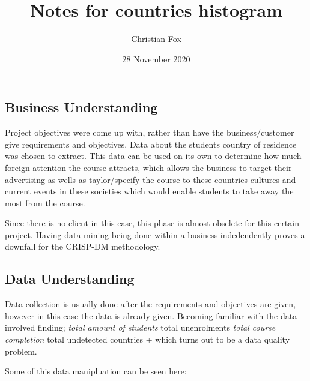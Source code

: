 \documentclass[]{article}
\title{Notes for countries histogram}
\author{Christian Fox}
\date{28 November 2020}
\begin{document}
\maketitle

\subsection{Business Understanding}\label{business-understanding}

Project objectives were come up with, rather than have the
business/customer give requirements and objectives. Data about the
students country of residence was chosen to extract. This data can be
used on its own to determine how much foreign attention the course
attracts, which allows the business to target their advertising as wells
as taylor/specify the course to these countries cultures and current
events in these societies which would enable students to take away the
most from the course.

Since there is no client in this case, this phase is almost obselete for
this certain project. Having data mining being done within a business
indedendently proves a downfall for the CRISP-DM methodology.

\subsection{Data Understanding}\label{data-understanding}

Data collection is usually done after the requirements and objectives
are given, however in this case the data is already given. Becoming
familiar with the data involved finding; \emph{total amount of students
}total unenrolments \emph{total course completion }total undetected
countries + which turns out to be a data quality problem.

Some of this data manipluation can be seen here:
\end{document}
